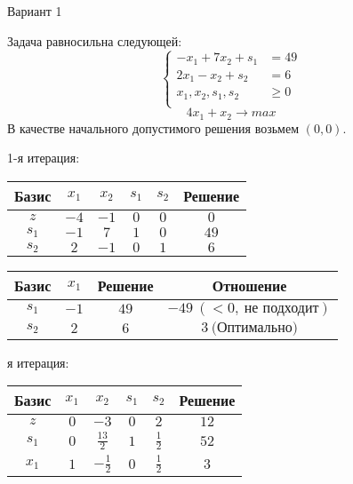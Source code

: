 \documentclass{article}%
\begin{document}
%
\normalsize%
\begin{center}%
\begin{Huge}%
Вариант 1%
\end{Huge}%
\end{center}%
Задача равносильна следующей: %
\[%
\left\{\begin{aligned}-x_{1}+7x_{2}+s_{1} & =49 \\2x_{1}-x_{2}+s_{2} & =6 \\x_{1},x_{2},s_{1},s_{2} & \ge 0 \\ \end{aligned}\right.%
\]%
\[%
4x_{1}+x_{2}  \to max%
\]%
В качестве начального допустимого решения возьмем %
$(0, 0).$%
\begin{flushleft}%
1{-}я итерация: %
\newline%
\newline%
\renewcommand{\arraystretch}{1.3}%
\begin{tabular}{|c|cccc|c|}%
\hline%
Базис&$x_{1}$&$x_{2}$&$s_{1}$&$s_{2}$&Решение\\%
\hline%
$z$&$-4$&$-1$&$0$&$0$&$0$\\%
\hline%
$s_{1}$&$-1$&$7$&$1$&$0$&$49$\\%
$s_{2}$&$2$&$-1$&$0$&$1$&$6$\\%
\hline%
\end{tabular}%
\newline%
\newline%
\newline%
\begin{tabular}{|cccc|}%
\hline%
Базис&$x_{1}$&Решение&Отношение\\%
\hline%
$s_{1}$&$-1$&$49$&$-49\: (< 0, \: \text{не подходит})$\\%
$s_{2}$&$2$&$6$&$3\: \text{(Оптимально)}$\\%
\hline%
\end{tabular}%
\newline%
\newline%
я итерация: %
\newline%
\newline%
\renewcommand{\arraystretch}{1.3}%
\begin{tabular}{|c|cccc|c|}%
\hline%
Базис&$x_{1}$&$x_{2}$&$s_{1}$&$s_{2}$&Решение\\%
\hline%
$z$&$0$&$-3$&$0$&$2$&$12$\\%
\hline%
$s_{1}$&$0$&$\frac{13}{2}$&$1$&$\frac{1}{2}$&$52$\\%
$x_{1}$&$1$&$-\frac{1}{2}$&$0$&$\frac{1}{2}$&$3$\\%

\end{tabular}
\end{flushleft}
\end{document}
